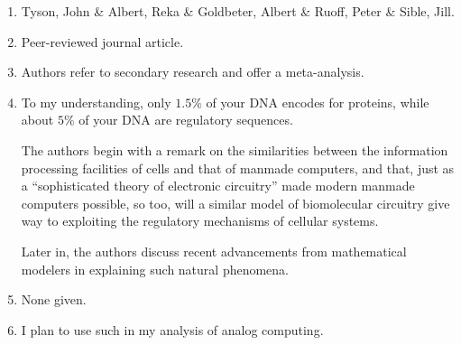 \begin{enumerate}
    \item Tyson, John \& Albert, Reka \& Goldbeter, Albert \& Ruoff, Peter \& Sible, Jill.
    \item Peer-reviewed journal article.
    \item Authors refer to secondary research and offer a meta-analysis.
    \item To my understanding, only $1.5\%$ of your DNA encodes for proteins, while about $5\%$ of your DNA are regulatory sequences.
    
    The authors begin with a remark on the similarities between the information processing facilities of cells and that of manmade computers, and that, just as a ``sophisticated theory of electronic circuitry'' made modern manmade computers possible, so too, will a similar model of biomolecular circuitry give way to exploiting the regulatory mechanisms of cellular systems. 

    Later in, the authors discuss recent advancements from mathematical modelers in explaining such natural phenomena.
    \item None given. 
    \item I plan to use such in my analysis of analog computing. 
\end{enumerate}

